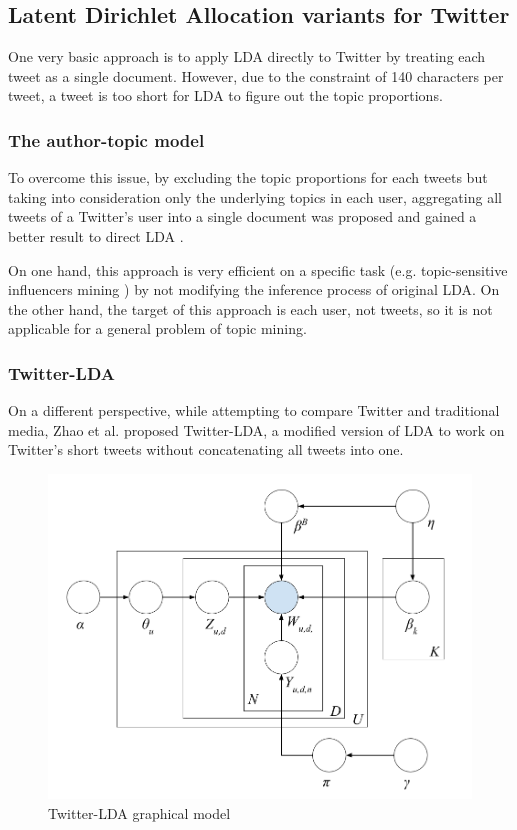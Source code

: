 \documentclass[conference,compsoc]{IEEEtran}
\begin{document}
\subsection{Latent Dirichlet Allocation variants for Twitter} \label{lda_app}

One very basic approach is to apply LDA directly to Twitter by treating each tweet as a single document. However, due to the constraint of 140 characters per tweet, a tweet is too short for LDA to figure out the topic proportions.

\subsubsection{The author-topic model} \label{author_topic}

To overcome this issue, by excluding the topic proportions for each tweets but taking into consideration only the underlying topics in each user, aggregating all tweets of a Twitter's user into a single document was proposed and gained a better result to direct LDA \cite{Weng2010,hong2010empirical}.

On one hand, this approach is very efficient on a specific task (e.g. topic-sensitive influencers mining \cite{Weng2010}) by not modifying the inference process of original LDA. On the other hand, the target of this approach is each user, not tweets, so it is not applicable for a general problem of topic mining.

\subsubsection{Twitter-LDA} \label{twitter_lda}

On a different perspective, while attempting to compare Twitter and traditional media, Zhao et al. \cite{zhao2011comparing} proposed Twitter-LDA, a modified version of LDA to work on Twitter's short tweets without concatenating all tweets into one.

\begin{figure}[h]
	\centering
	\includegraphics[scale=0.2]{twitter_lda_model}
	\caption{Twitter-LDA graphical model}
	\label{fig:twitter_lda_model}
\end{figure}
\end{document}
